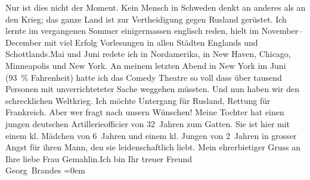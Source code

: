 \begin{ledgroupsized}[t]{13cm}
           \pstart
           Nur ist dies nicht der Moment. Kein Mensch in Schweden denkt an anderes als an den Krieg; das ganze Land ist zur
               Vertheidigung gegen Rusland gerüstet.\pend
           \pstart
           {\pb}Ich lernte im vergangenen Sommer
               einigermassen englisch reden, hielt im November–December
               mit viel Erfolg Vorlesungen in allen Städten Englands und Schottlands.\hspace*{2em}Mai und Juni redete ich in Nordamerika, in New Haven, Chicago, Minneapolis und New York. An meinem
               letzten Abend in New York im Juni
                  (93 {\%} Fahrenheit) hatte ich das Comedy Theatre so voll dass über tausend Personen mit
               unverrichteteter Sache weggehen müssten.\pend
           \pstart
           Und nun haben wir den schrecklichen Weltkrieg. Ich möchte Untergang für Rusland, Rettung für Frankreich. Aber wer fragt nach unsern Wünschen! Meine Tochter hat einen jungen
               deutschen Artillerieofficier
               von 32 Jahren zum Gatten. Sie ist hier mit einem kl. Mädchen von 6 Jahren und einem kl. Jungen von 2 Jahren in
               grosser Angst für ihren Mann,
               den sie leidenschaftlich liebt.\pend
           \pstart
           Mein ehrerbietiger Gruss an Ihre liebe Frau Gemahlin.\hspace*{2em}Ich bin Ihr
               treuer Freund{\\[\baselineskip]}\spacefill\mbox{Georg Brandes}\pend
           \leftskip=0em{}
         
         \endnumbering{}\end{ledgroupsized}  \newcommand{\dateiname}{L02195}\newcommand{\titel}{Georg Brandes an Arthur Schnitzler, 23. 8. 1914}\newcommand{\editorInnen}{Martin Anton Müller und Gerd-Hermann Susen}
      